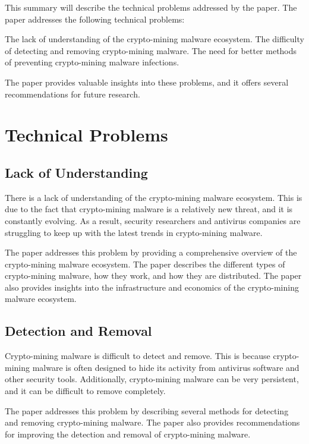 \documentclass[sigconf]{acmart}
\begin{document}
This summary will describe the technical problems addressed by the paper. The paper addresses the following technical problems:

    The lack of understanding of the crypto-mining malware ecosystem.
    The difficulty of detecting and removing crypto-mining malware.
    The need for better methods of preventing crypto-mining malware infections.

The paper provides valuable insights into these problems, and it offers several recommendations for future research.

\section{Technical Problems}

\subsection{Lack of Understanding}

There is a lack of understanding of the crypto-mining malware ecosystem. This is due to the fact that crypto-mining malware is a relatively new threat, and it is constantly evolving. As a result, security researchers and antivirus companies are struggling to keep up with the latest trends in crypto-mining malware.

The paper addresses this problem by providing a comprehensive overview of the crypto-mining malware ecosystem. The paper describes the different types of crypto-mining malware, how they work, and how they are distributed. The paper also provides insights into the infrastructure and economics of the crypto-mining malware ecosystem.

\subsection{Detection and Removal}

Crypto-mining malware is difficult to detect and remove. This is because crypto-mining malware is often designed to hide its activity from antivirus software and other security tools. Additionally, crypto-mining malware can be very persistent, and it can be difficult to remove completely.

The paper addresses this problem by describing several methods for detecting and removing crypto-mining malware. The paper also provides recommendations for improving the detection and removal of crypto-mining malware.
\end{document}
